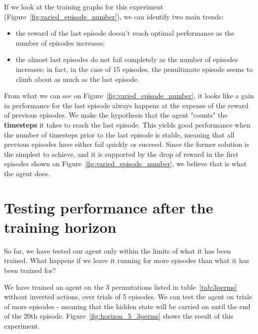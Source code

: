 If we look at the training graphs for this experiment 
(Figure~\ref{fig:varied_episode_number}), we can identify two main trends:
\begin{itemize}
	\item the reward of the last episode doesn't reach optimal performance
		as the number of episodes increases;
	\item the almost last episodes do not fail completely as the number of 
		episodes increases; in fact, in the case of 15 episodes, the
		penultimate episode seems to climb about as much as the last
		episode.
\end{itemize}

From what we can see on Figure~\ref{fig:varied_episode_number}, it looks like
a gain in performance for the last episode always happens at the expense of
the reward of previous episodes. We make the hypothesis that the agent
"counts" the \textbf{timesteps} it takes to reach the last episode. This yields good
performance when the number of timesteps prior to the last episode is stable, 
meaning that all previous episodes have either fail quickly or succeed. Since
the former solution is the simplest to achieve, and it is supported by the 
drop of reward in the first episodes shown on 
Figure~\ref{fig:varied_episode_number}, we believe that is what the agent does.


\section{Testing performance after the training horizon}
So far, we have tested our agent only within the limits of what it has been
trained. What happens if we leave it running for more episodes than what it
has been trained for?


We have trained an agent on the 3 permutations listed in table~\ref{tab:3perms}
without inverted actions, over trials of 5 episodes.
We can test the agent on trials of more episodes - meaning that the hidden
state will be carried on until the end of the 20th episode.
Figure~\ref{fig:horizon_5_3perms} shows the result of this experiment.\\

